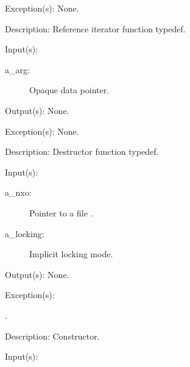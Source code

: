 \begin{capi}
\begin{capilist}
\begin{description}
\begin{description}
			\end{description}
		\end{description}
	\item[Exception(s): ] None.
	\item[Description: ]
		Reference iterator function typedef.
	\end{capilist}
\label{cw_nxo_file_delete_t}
	\begin{capilist}
	\item[Input(s): ]
		\begin{description}\item[]
		\item[a\_arg: ]
			Opaque data pointer.
		\end{description}
	\item[Output(s): ] None.
	\item[Exception(s): ] None.
	\item[Description: ]
		Destructor function typedef.
	\end{capilist}
\label{nxo_file_new}
	\begin{capilist}
	\item[Input(s): ]
		\begin{description}\item[]
		\item[a\_nxo: ]
			Pointer to a file .
		\item[a\_locking: ]
			Implicit locking mode.
		\end{description}
	\item[Output(s): ] None.
	\item[Exception(s): ]
		\begin{description}\item[]
		\item[.]
		\end{description}
	\item[Description: ]
		Constructor.
	\end{capilist}
\label{nxo_file_fd_wrap}
	\begin{capilist}
	\item[Input(s): ]
		\begin{description}\item[]

\end{description}
\end{capilist}
\end{capi}
